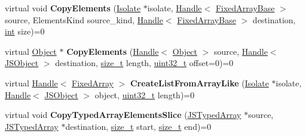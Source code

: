 \begin{DoxyCompactItemize}
\item 
\mbox{\label{classv8_1_1internal_1_1ElementsAccessor_aff55fe71ab608328f8cac96d9f5b376e}} 
virtual void {\bfseries Copy\+Elements} (\mbox{\hyperlink{classv8_1_1internal_1_1Isolate}{Isolate}} $\ast$isolate, \mbox{\hyperlink{classv8_1_1internal_1_1Handle}{Handle}}$<$ \mbox{\hyperlink{classv8_1_1internal_1_1FixedArrayBase}{Fixed\+Array\+Base}} $>$ source, Elements\+Kind source\+\_\+kind, \mbox{\hyperlink{classv8_1_1internal_1_1Handle}{Handle}}$<$ \mbox{\hyperlink{classv8_1_1internal_1_1FixedArrayBase}{Fixed\+Array\+Base}} $>$ destination, \mbox{\hyperlink{classint}{int}} size)=0
\item 
\mbox{\label{classv8_1_1internal_1_1ElementsAccessor_a66f4564ce0d7990c3928aa4b2bf04c9d}} 
virtual \mbox{\hyperlink{classv8_1_1internal_1_1Object}{Object}} $\ast$ {\bfseries Copy\+Elements} (\mbox{\hyperlink{classv8_1_1internal_1_1Handle}{Handle}}$<$ \mbox{\hyperlink{classv8_1_1internal_1_1Object}{Object}} $>$ source, \mbox{\hyperlink{classv8_1_1internal_1_1Handle}{Handle}}$<$ \mbox{\hyperlink{classv8_1_1internal_1_1JSObject}{J\+S\+Object}} $>$ destination, \mbox{\hyperlink{classsize__t}{size\+\_\+t}} length, \mbox{\hyperlink{classuint32__t}{uint32\+\_\+t}} offset=0)=0
\item 
\mbox{\label{classv8_1_1internal_1_1ElementsAccessor_a7f49d6ffe5d5ea7ea8b234de3f501b0c}} 
virtual \mbox{\hyperlink{classv8_1_1internal_1_1Handle}{Handle}}$<$ \mbox{\hyperlink{classv8_1_1internal_1_1FixedArray}{Fixed\+Array}} $>$ {\bfseries Create\+List\+From\+Array\+Like} (\mbox{\hyperlink{classv8_1_1internal_1_1Isolate}{Isolate}} $\ast$isolate, \mbox{\hyperlink{classv8_1_1internal_1_1Handle}{Handle}}$<$ \mbox{\hyperlink{classv8_1_1internal_1_1JSObject}{J\+S\+Object}} $>$ object, \mbox{\hyperlink{classuint32__t}{uint32\+\_\+t}} length)=0
\item 
\mbox{\label{classv8_1_1internal_1_1ElementsAccessor_a2c0bb98c0876ada5c4a05ab1fdc20158}} 
virtual void {\bfseries Copy\+Typed\+Array\+Elements\+Slice} (\mbox{\hyperlink{classv8_1_1internal_1_1JSTypedArray}{J\+S\+Typed\+Array}} $\ast$source, \mbox{\hyperlink{classv8_1_1internal_1_1JSTypedArray}{J\+S\+Typed\+Array}} $\ast$destination, \mbox{\hyperlink{classsize__t}{size\+\_\+t}} start, \mbox{\hyperlink{classsize__t}{size\+\_\+t}} end)=0
\end{DoxyCompactItemize}
